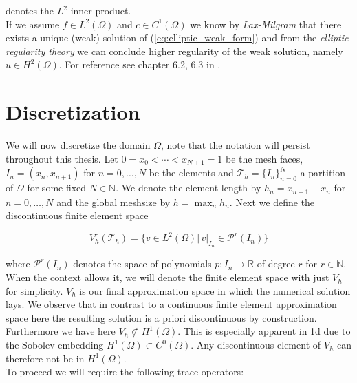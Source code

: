 denotes the $L^2$-inner product. \\
If we assume $f \in L^2(\Omega)$ and $c \in C^1(\Omega)$ we know by \textit{Lax-Milgram} 
that there exists a unique (weak) solution of (\ref{eq:elliptic_weak_form}) and from the \textit{elliptic regularity theory} we 
can conclude higher regularity of the weak solution, namely $u \in H^2(\Omega)$. For reference see chapter 6.2, 6.3 in \cite{EvansPDE}.

\section{Discretization}
\label{sec:discretization_elliptic}
We will now discretize the domain $\Omega$, note that the notation will persist throughout this thesis. 
Let $0=x_0 < \cdots < x_{N+1} = 1$ be the mesh faces, $I_n = (x_n, x_{n+1})$ for $n = 0,\ldots,N$ be the elements and $\mathcal{T}_h = \{I_n\}_{n=0}^N$ a partition
of $\Omega$ for some fixed $N\in \mathbb{N}$.
We denote the element length by $h_n = x_{n+1} - x_{n}$ for $n=0,\ldots,N$ and the global meshsize by
$h = \max_{n} h_n$.
Next we define the discontinuous finite element space
\begin{tcolorbox}[mythmstyle, colback=green!10!white]
	\begin{equation}
		V_h^r(\mathcal{T}_h) = \{v \in L^2(\Omega) |\, v|_{I_n} \in \mathcal{P}^r(I_n) \}
	\end{equation}
\end{tcolorbox}
where $\mathcal{P}^r(I_n)$ denotes the space of polynomials $p:I_n \to \mathbb{R}$ of degree $r$
for $r \in \mathbb{N}$. When the context allows it, we will denote the
finite element space with just $V_h$ for simplicity.
$V_h$ is our final approximation space in which the numerical solution
lays.
We observe that in contrast to a continuous finite element approximation space
here the resulting solution is a priori discontinuous by construction.
Furthermore we have here $V_h \not\subset H^1(\Omega)$.
This is especially apparent in 1d due to the Sobolev embedding $H^1(\Omega) \subset C^0(\Omega)$.
Any discontinuous element of $V_h$ can therefore not be in $H^1(\Omega)$. \\
To proceed we will require the following trace operators:


